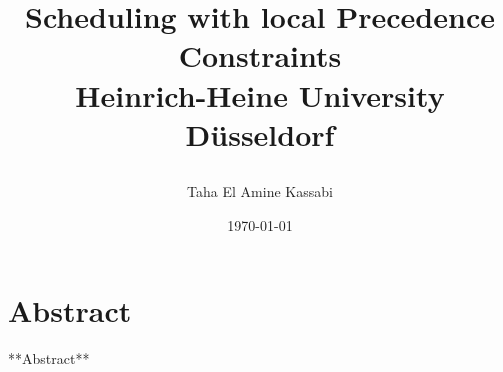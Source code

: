 \documentclass{report}
\title{
\begin{figure}
    \centering
    
\end{figure}

    Scheduling with local Precedence Constraints\\
    {\Large Heinrich-Heine University Düsseldorf}
}
\author{Taha El Amine Kassabi}
\date{\today}
\begin{document}
    

    \maketitle

    \chapter*{Abstract}
    **Abstract**

    \tableofcontents

    
    
    
    
    

    \appendix
    
    
\end{document}
